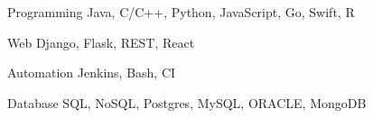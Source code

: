 

\begin{cvskills}

  \cvskill
    {Programming} %
    {Java, C/C++, Python, JavaScript, Go, Swift, R} %

  \cvskill
    {Web} %
    {Django, Flask, REST, React} %
    
  \cvskill
    {Automation}
    {Jenkins, Bash, CI}

  \cvskill
  	{Database}
  	{SQL, NoSQL, Postgres, MySQL, ORACLE, MongoDB}

\end{cvskills}